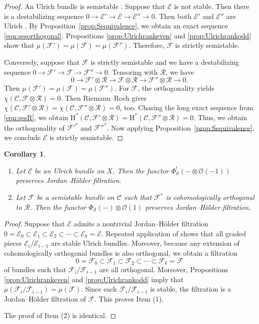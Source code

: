 \documentclass[12pt, letterpaper]{amsart}
\newtheorem{corollary}[theorem]{Corollary}
\theoremstyle{definition}
\newcommand{\cC}{\mathcal{C} }
\newcommand{\cE}{\mathcal{E} }
\newcommand{\cF}{\mathcal{F} }
\newcommand{\cO}{\mathcal{O} }
\newcommand{\cR}{\mathcal{R} }
\newcommand{\cS}{\mathcal{S} }
\newcommand{\rH}{\mathrm{H} }
\begin{document}
\begin{proof}
An Ulrich bundle is semistable \cite[Proposition~3.3.14]{CMRPL21}. Suppose that \(\cE\) is not stable. Then there is a destabilizing sequence \(0 \to \cE' \to \cE \to \cE'' \to 0\). Then both \(\cE'\) and \(\cE''\) are Ulrich \cite[Proposition~3.3.1, Proposition~3.3.16]{CMRPL21}. By Proposition~\ref{prop:Sequivalence}, we obtain an exact sequence \eqref{eqn:sesorthogonal}. Propositions \ref{prop:Ulrichrankeven} and \ref{prop:Ulrichrankodd} show that \(\mu(\cF') = \mu(\cF) = \mu(\cF'')\). Therefore, \(\cF\) is strictly semistable.

Conversely, suppose that \(\cF\) is strictly semistable and we have a destabilizing sequence \(0 \to \cF' \to \cF \to \cF'' \to 0\). Tensoring with \(\cR\), we have
\begin{equation}\label{eqn:sesR}
0 \to \cF' \otimes \cR \to \cF \otimes \cR \to \cF'' \otimes \cR \to 0.
\end{equation}
Then \(\mu(\cF') = \mu(\cF) = \mu(\cF'')\). For \(\cF\), the orthogonality yields \(\chi(\cC, \cF \otimes \cR) = 0\). Then Riemann--Roch gives \(\chi(\cC, \cF' \otimes \cR) = \chi(\cC, \cF'' \otimes \cR) = 0\), too. Chasing the long exact sequence from \eqref{eqn:sesR}, we obtain \(\rH^*(\cC, \cF' \otimes \cR) = \rH^*(\cC, \cF'' \otimes \cR) = 0\). Thus, we obtain the orthogonality of \({\cF'}^*\) and \({\cF''}^*\). Now applying Proposition~\ref{prop:Sequivalence}, we conclude \(\cE\) is strictly semistable.
\end{proof}

\begin{corollary}\label{cor:Sequivalence}
\begin{enumerate}
  \item Let \(\cE\) be an Ulrich bundle on \(X\). Then the functor \(\Phi_{\cS}^!(-\otimes \cO(-1))\) preserves Jordan--H\"older filtration.
  \item Let \(\cF\) be a semistable bundle on \(\cC\) such that \(\cF^*\) is cohomologically orthogonal to \(\cR\). Then the functor \(\Phi_{\cS}(-)\otimes \cO(1)\) preserves Jordan--H\"older filtration.
\end{enumerate}
\end{corollary}

\begin{proof}
Suppose that \(\cE\) admits a nontrivial Jordan--H\"older filtration \(0= \cE_0 \subset \cE_1 \subset \cE_2 \subset \cdots \subset \cE_k = \cE\). Repeated application of \cite[Proposition~3.3.1, Proposition~3.3.16]{CMRPL21} shows that all graded pieces \(\cE_i/\cE_{i-1}\) are stable Ulrich bundles. Moreover, because any extension of cohomologically orthogonal bundles is also orthogonal, we obtain a filtration
\[0= \cF_0 \subset \cF_1 \subset \cF_2 \subset \cdots \subset \cF_k = \cF\]
of bundles such that \(\cF_i/\cF_{i-1}\) are all orthogonal. Moreover, Propositions \ref{prop:Ulrichrankeven} and \ref{prop:Ulrichrankodd} imply that \(\mu(\cF_i/\cF_{i-1}) = \mu(\cF)\). Since each \(\cF_i/\cF_{i-1}\) is stable, the filtration is a Jordan--H\"older filtration of \(\cF\). This proves Item (1).

The proof of Item (2) is identical.
\end{proof}
\end{document}
